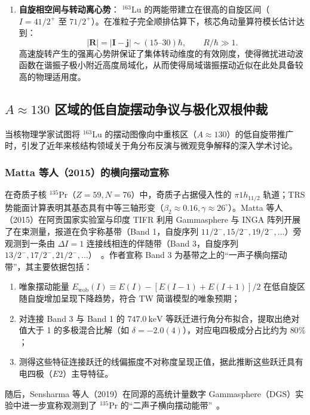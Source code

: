 \begin{enumerate}
\item \textbf{自旋相空间与转动离心势}：
$^{163}\mathrm{Lu}$ 的两能带建立在很高的自旋区间（$I = 41/2^+$ 至 $71/2^+$）。在准粒子完全顺排估算下，核芯角动量算符模长估计达到：
\begin{equation}\label{eq:4-4-lu163-core-spin}
|\mathbf{R}| = |\mathbf{I} - \mathbf{j}| \sim (15\text{--}30)\hbar,\qquad R/\hbar\gg1.
\end{equation}
高速旋转产生的强离心势阱保证了集体转动维度的有效刚度，使得微扰进动波函数在谐振子极小附近高度局域化，从而使得局域谐振摆动近似在此处具备较高的物理适用度。
\end{enumerate}

\subsection{$A\approx 130$ 区域的低自旋摆动争议与极化双根仲裁}\label{sec:4-4-3}

当核物理学家试图将 $^{163}\mathrm{Lu}$ 的摆动图像向中重核区（$A\approx 130$）的低自旋带推广时，引发了近年来核结构领域关于角分布反演与微观竞争解释的深入学术讨论。

\subsubsection{Matta 等人（2015）的横向摆动宣称}

在奇质子核 $^{135}\mathrm{Pr}$（$Z=59, N=76$）中，奇质子占据侵入性的 $\pi 1h_{11/2}$ 轨道；TRS 势能面计算表明其基态具有中等三轴形变（$\beta_2 \approx 0.16, \gamma \approx 26^\circ$）。Matta 等人（2015）在阿贡国家实验室与印度 TIFR 利用 Gammasphere 与 INGA 阵列开展了在束测量，报道在负宇称基带（Band 1，自旋序列 $11/2^-, 15/2^-, 19/2^-, \dots$）旁观测到一条由 $\Delta I = 1$ 连接线相连的伴随带（Band 3，自旋序列 $13/2^-, 17/2^-, 21/2^-, \dots$）~\cite{matta-2015-transverse-wobbling-135pr}。作者宣称 Band 3 为基带之上的“一声子横向摆动带”，其主要依据包括：
\begin{enumerate}
\item 唯象摆动能量 $E_{\text{wob}}(I) \equiv E(I) - [E(I-1) + E(I+1)]/2$ 在低自旋区随自旋增加呈现下降趋势，符合 TW 简谐模型的唯象预期；
\item 对连接 Band 3 与 Band 1 的 $747.0\ \mathrm{keV}$ 等跃迁进行角分布拟合，提取出绝对值大于 1 的多极混合比解（如 $\delta = -2.0(4)$），对应电四极成分占比约为 $80\%$；
\item 测得这些特征连接跃迁的线偏振度不对称度呈现正值，据此推断这些跃迁具有电四极（$E2$）主导特征。
\end{enumerate}
随后，Sensharma 等人（2019）在同源的高统计量数字 Gammasphere（DGS）实验中进一步宣称观测到了 $^{135}\mathrm{Pr}$ 的“二声子横向摆动能带”~\cite{sensharma-2019-two-phonon-wobbling-135pr}。

